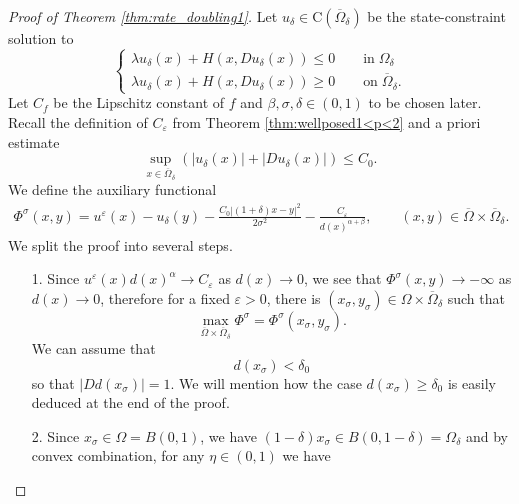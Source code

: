 \documentclass[11pt,reqno]{amsart}
\numberwithin{figure}{section}
\theoremstyle{plain}
\theoremstyle{remark}
\numberwithin{equation}{section}
\begin{document}
\begin{proof}[Proof of Theorem \ref{thm:rate_doubling1}] Let $u_\delta\in \mathrm{C}(\overline{\Omega}_\delta)$ be the state-constraint solution to
\begin{equation}\label{e:PDE_delta}
    \begin{cases}  
    \lambda u_\delta(x) + H(x,Du_\delta(x)) \leq 0 \qquad\text{in}\; \Omega_\delta\\
    \lambda u_\delta(x) + H(x,Du_\delta(x)) \geq 0 \qquad\text{on}\; \overline{\Omega}_\delta.
    \end{cases} \tag{PDE$_\delta$}
\end{equation} 
Let $C_f$ be the Lipschitz constant of $f$ and $\beta,\sigma,\delta \in (0,1)$ to be chosen later. Recall the definition of $C_\varepsilon$ from Theorem \ref{thm:wellposed1<p<2} and a priori estimate
\begin{equation*}
    \sup_{x\in \overline{\Omega}_\delta} \left(|u_\delta(x)| + |Du_\delta(x)|\right) \leq C_0.
\end{equation*}
We define the auxiliary functional
\begin{align*}
    \Phi^{\sigma}(x,y) =  u^\varepsilon(x) - u_\delta(y) - \frac{C_0|(1+\delta)x-y |^2}{2\sigma^2}- \frac{C_\varepsilon}{d(x)^{\alpha+\beta}}, \qquad (x,y)\in \overline{\Omega}\times\overline{\Omega}_\delta.
\end{align*}
We split the proof into several steps.
\begin{enumerate}
    \item[1.] Since $u^\varepsilon (x)d(x)^\alpha \to C_\varepsilon$ as $d(x)\to 0$, we see that $\Phi^\sigma(x,y)\to -\infty$ as $d(x)\to 0$, therefore for a fixed $\varepsilon>0$, there is $(x_{\sigma},y_\sigma)\in \Omega\times\overline{\Omega}_\delta$ such that 
\begin{equation*}
    \max_{\overline{\Omega}\times \overline{\Omega}_\delta} \Phi^\sigma = \Phi^\sigma(x_\sigma,y_\sigma).
\end{equation*}
We can assume that 
\begin{equation}\label{e:ass_delta0}
    d(x_\sigma) < \delta_0
\end{equation}
so that $|Dd(x_\sigma)| = 1$. We will mention how the case $d(x_\sigma)\geq \delta_0$ is easily deduced at the end of the proof.
\item[2.] Since $x_\sigma\in \Omega = B(0,1)$, we have $(1-\delta)x_\sigma \in B(0,1-\delta) = \Omega_\delta$ and by convex combination, for any $\eta\in (0,1)$ we have
\begin{equation*}

\end{equation*}
\end{enumerate}
\end{proof}
\end{document}
